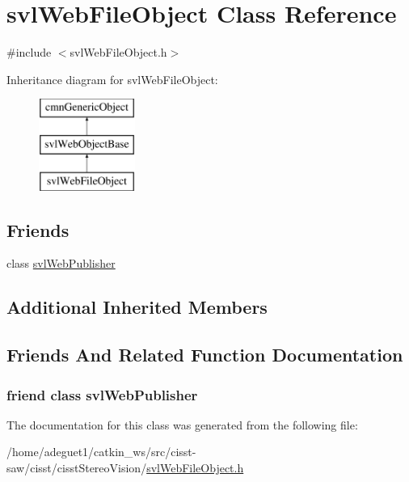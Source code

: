 \hypertarget{classsvl_web_file_object}{\section{svl\-Web\-File\-Object Class Reference}
\label{classsvl_web_file_object}
}


{\ttfamily \#include $<$svl\-Web\-File\-Object.\-h$>$}

Inheritance diagram for svl\-Web\-File\-Object\-:\begin{figure}[H]
\begin{center}
\leavevmode
\includegraphics[height=3.000000cm]{d2/db0/classsvl_web_file_object}
\end{center}
\end{figure}
\subsection*{Friends}
\begin{DoxyCompactItemize}
\item 
class \hyperlink{classsvl_web_file_object_a5da5a059398f07bd737af2dae959acfa}{svl\-Web\-Publisher}
\end{DoxyCompactItemize}
\subsection*{Additional Inherited Members}


\subsection{Friends And Related Function Documentation}
\hypertarget{classsvl_web_file_object_a5da5a059398f07bd737af2dae959acfa}{
\subsubsection[{svl\-Web\-Publisher}]{\setlength{\rightskip}{0pt plus 5cm}friend class {\bf svl\-Web\-Publisher}\hspace{0.3cm}{\ttfamily [friend]}}}\label{classsvl_web_file_object_a5da5a059398f07bd737af2dae959acfa}


The documentation for this class was generated from the following file\-:\begin{DoxyCompactItemize}
\item 
/home/adeguet1/catkin\-\_\-ws/src/cisst-\/saw/cisst/cisst\-Stereo\-Vision/\hyperlink{svl_web_file_object_8h}{svl\-Web\-File\-Object.\-h}\end{DoxyCompactItemize}
